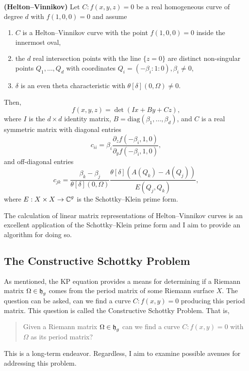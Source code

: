 \begin{theorem}
{\bf (Helton--Vinnikov)} Let $C : f(x,y,z) = 0$ be a real homogeneous
curve of degree $d$ with $f(1,0,0) = 0$ and assume
\begin{enumerate}
  \item $C$ is a Helton--Vinnikov curve with the point $f(1,0,0) = 0$
    inside the innermost oval,
  \item the $d$ real intersection points with the line $\{z = 0\}$ are
    distinct non-singular points $Q_1,\ldots,Q_d$ with coordinates $Q_i
    = (-\beta_i : 1 : 0), \beta_i \neq 0$,
  \item $\delta$ is an even theta characteristic with
    $\theta[\delta](0,\Omega) \neq 0$.
\end{enumerate}
Then,
\[
    f(x,y,z) = \det \left( Ix + By + Cz \right),
\]
where $I$ is the $d \times d$ identity matrix, $B =
\text{diag}(\beta_1,\ldots,\beta_d)$, and $C$ is a real symmetric matrix
with diagonal entries
\[
    c_{ii} = \beta_i
    \frac{\partial_z f(-\beta_i,1,0)}{\partial_y f(-\beta_i,1,0)},
\]
and off-diagonal entries
\[
    c_{jk} = \frac{\beta_k - \beta_j}{\theta[\delta](0,\Omega)}
    \frac{\theta[\delta](A(Q_k) - A(Q_j))}{E(Q_j,Q_k)},
\]
where $E : X \times X \to \operatorname{\mathbb{C}}^g$ is the Schottky--Klein prime form.
\end{theorem}

The calculation of linear matrix representations of Helton--Vinnikov
curves is an excellent application of the Schottky--Klein prime form and
I aim to provide an algorithm for doing so.


\subsection{The Constructive Schottky Problem}

As mentioned, the KP equation provides a means for determining if a
Riemann matrix $\Omega \in \operatorname{\mathfrak{h}}_g$ comes from the period matrix of some
Riemann surface $X$. The question can be asked, can we find a curve $C :
f(x,y) = 0$ producing this period matrix. This question is called the
Constructive Schottky Problem. That is,
\begin{quote}
  Given a Riemann matrix $\Omega \in \operatorname{\mathfrak{h}}_g$ can we find a curve $C :
  f(x,y) = 0$ with $\Omega$ as its period matrix?
\end{quote}
This is a long-term endeavor. Regardless, I aim to examine possible
avenues for addressing this problem.
